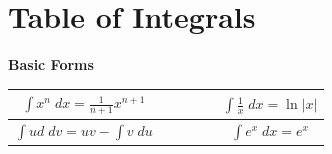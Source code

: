 \documentclass[12pt]{report}
\begin{document}
\section{Table of Integrals}
\begin{center}
\begin{large}

\textbf{Basic Forms}

\bigskip
\def\arraystretch{1.5}
\begin{tabular}{ c | c }
	$ \int x^n \; dx = \frac{1}{n+1}x^{n+1}  \quad \quad $ &
	$ \quad \quad \int \frac{1}{x} \; dx = \ln|x| $ \\
	
	\hline

	$ \int ud \; dv = uv - \int v \; du  \quad \quad $ &
	$ \quad \quad \int e^x \; dx = e^x $ \\
\end{tabular}



\end{large}
\end{center}
\end{document}
